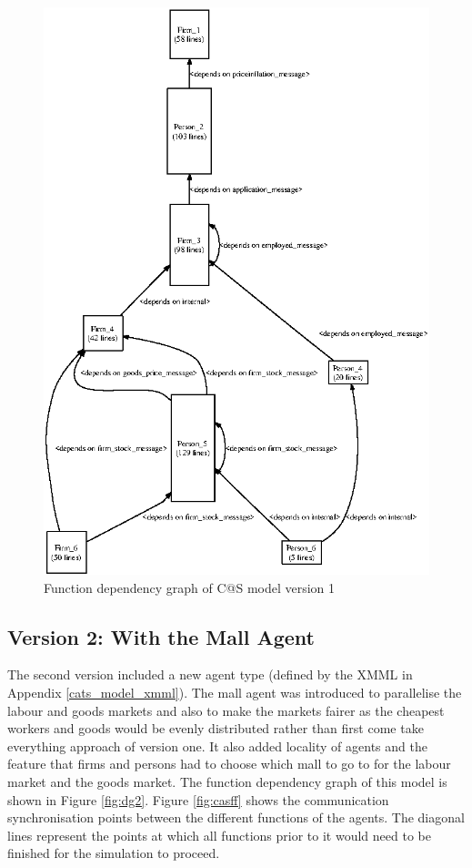 \documentclass[a4paper,11pt]{article}
\begin{document}
\begin{figure}
\begin{center}
\includegraphics*[scale=1.5]{cats_dgraph_v1.eps}
\caption{Function dependency graph of C@S model version 1}
\label{fig:dg1}
\end{center}
\end{figure}

\subsection{Version 2: With the Mall Agent}

The second version included a new agent type (defined by the XMML in Appendix \ref{cats_model_xmml}). The mall agent was
introduced to parallelise the labour and goods markets and also to make
the markets fairer as the cheapest workers and goods would be evenly
distributed rather than first come take everything approach of
version one. It also added locality of agents and the feature that firms and persons had to
choose which mall to go to for the labour market and the goods
market. The function dependency graph of this model is shown in Figure \ref{fig:dg2}.
Figure \ref{fig:casff} shows the communication
synchronisation points between the different functions of the agents. The diagonal lines represent the points at
which all functions prior to it would need to be finished for the simulation to proceed.
\end{document}
